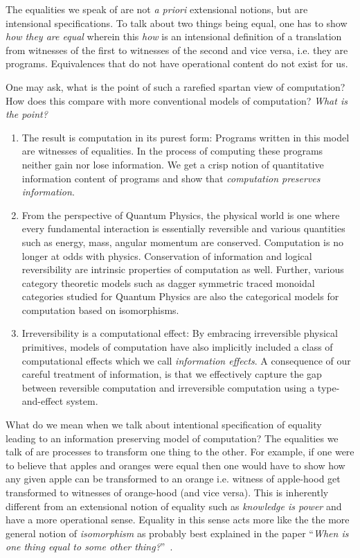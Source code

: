 \documentclass{article}
\begin{document}
The equalities we speak of are not \emph{a priori} extensional
notions, but are intensional specifications. To talk about two things
being equal, one has to show \emph{how they are equal} wherein this
\emph{how} is an intensional definition of a translation from
witnesses of the first to witnesses of the second and vice versa,
i.e. they are programs. Equivalences that do not have operational
content do not exist for us.

One may ask, what is the point of such a rarefied spartan view of
computation? How does this compare with more conventional models of
computation?  \emph{What is the point?}

\begin{enumerate}

\item The result is computation in its purest form: Programs written
  in this model are witnesses of equalities. In the process of
  computing these programs neither gain nor lose information. We get a
  crisp notion of quantitative information content of programs and
  show that \emph{computation preserves information}.

\item From the perspective of Quantum Physics, the physical world is
  one where every fundamental interaction is essentially reversible
  and various quantities such as energy, mass, angular momentum are
  conserved. Computation is no longer at odds with
  physics. Conservation of information and logical reversibility are
  intrinsic properties of computation as well. Further, various
  category theoretic models such as dagger symmetric traced monoidal
  categories studied for Quantum Physics are also the categorical
  models for computation based on isomorphisms.

\item Irreversibility is a computational effect: By embracing
  irreversible physical primitives, models of computation have also
  implicitly included a class of computational effects which we call
  \emph{information effects}. A consequence of our careful treatment
  of information, is that we effectively capture the gap between
  reversible computation and irreversible computation using a
  type-and-effect system.

\end{enumerate}

What do we mean when we talk about intentional specification of
equality leading to an information preserving model of computation?
The equalities we talk of are processes to transform one thing to the
other. For example, if one were to believe that apples and oranges
were equal then one would have to show how any given apple can be
transformed to an orange i.e. witness of apple-hood get transformed to
witnesses of orange-hood (and vice versa). This is inherently
different from an extensional notion of equality such as
\emph{knowledge is power} and have a more operational sense. Equality
in this sense acts more like the the more general notion of
\emph{isomorphism} as probably best explained in the paper
``\emph{When is one thing equal to some other
  thing?}''~\cite{mazur2008one}.
\end{document}
